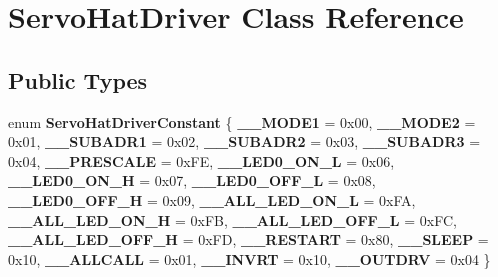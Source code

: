 \hypertarget{classServoHatDriver}{}\section{Servo\+Hat\+Driver Class Reference}
\label{classServoHatDriver}
\subsection*{Public Types}
\begin{DoxyCompactItemize}
\item 
\mbox{\label{classServoHatDriver_a8b0b713c06c269876e08fa3e8f48bac3}} 
enum {\bfseries Servo\+Hat\+Driver\+Constant} \{ \newline
{\bfseries \+\_\+\+\_\+\+M\+O\+D\+E1} = 0x00, 
{\bfseries \+\_\+\+\_\+\+M\+O\+D\+E2} = 0x01, 
{\bfseries \+\_\+\+\_\+\+S\+U\+B\+A\+D\+R1} = 0x02, 
{\bfseries \+\_\+\+\_\+\+S\+U\+B\+A\+D\+R2} = 0x03, 
\newline
{\bfseries \+\_\+\+\_\+\+S\+U\+B\+A\+D\+R3} = 0x04, 
{\bfseries \+\_\+\+\_\+\+P\+R\+E\+S\+C\+A\+LE} = 0x\+FE, 
{\bfseries \+\_\+\+\_\+\+L\+E\+D0\+\_\+\+O\+N\+\_\+L} = 0x06, 
{\bfseries \+\_\+\+\_\+\+L\+E\+D0\+\_\+\+O\+N\+\_\+H} = 0x07, 
\newline
{\bfseries \+\_\+\+\_\+\+L\+E\+D0\+\_\+\+O\+F\+F\+\_\+L} = 0x08, 
{\bfseries \+\_\+\+\_\+\+L\+E\+D0\+\_\+\+O\+F\+F\+\_\+H} = 0x09, 
{\bfseries \+\_\+\+\_\+\+A\+L\+L\+\_\+\+L\+E\+D\+\_\+\+O\+N\+\_\+L} = 0x\+FA, 
{\bfseries \+\_\+\+\_\+\+A\+L\+L\+\_\+\+L\+E\+D\+\_\+\+O\+N\+\_\+H} = 0x\+FB, 
\newline
{\bfseries \+\_\+\+\_\+\+A\+L\+L\+\_\+\+L\+E\+D\+\_\+\+O\+F\+F\+\_\+L} = 0x\+FC, 
{\bfseries \+\_\+\+\_\+\+A\+L\+L\+\_\+\+L\+E\+D\+\_\+\+O\+F\+F\+\_\+H} = 0x\+FD, 
{\bfseries \+\_\+\+\_\+\+R\+E\+S\+T\+A\+RT} = 0x80, 
{\bfseries \+\_\+\+\_\+\+S\+L\+E\+EP} = 0x10, 
\newline
{\bfseries \+\_\+\+\_\+\+A\+L\+L\+C\+A\+LL} = 0x01, 
{\bfseries \+\_\+\+\_\+\+I\+N\+V\+RT} = 0x10, 
{\bfseries \+\_\+\+\_\+\+O\+U\+T\+D\+RV} = 0x04
 \}
\end{DoxyCompactItemize}
